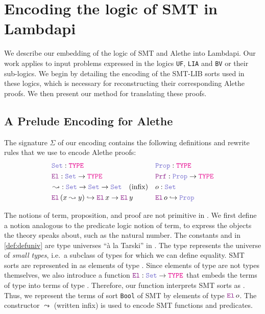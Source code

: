 
\chapter{Encoding the logic of SMT in Lambdapi} \label{ch:encoding}

We describe our embedding of the logic of SMT and Alethe into Lambdapi.
Our work applies to input problems expressed in the logics \texttt{UF}, \texttt{LIA} and \texttt{BV} or their sub-logics.
We begin by detailing the encoding of the SMT-LIB sorts used in these logics, which is necessary for reconstructing their corresponding Alethe proofs.
We then present our method for translating these proofs.

\section{A Prelude Encoding for Alethe}
\label{sec:encoding-prelude}

\begin{definition}
\label{def:defuniv}
The signature $\Sigma$ of our encoding contains the following definitions and rewrite rules that we use to encode Alethe proofs:
\begin{align*}
&\set\index{\set}: \type & &\prop\index{\prop}: \type \\
&\index{\el{}} \el{}: \set \rightarrow \type  & &\index{\prf}\prf{} : \prop \rightarrow \type \\
&\mathop{\leadsto}\index{$\leadsto$}: \set \rightarrow \set \rightarrow \set \quad \text{(infix)} & &o: \set \\
&\el\,(x \leadsto y) \hookrightarrow \el\,x \rightarrow \el\,y & &\el\,o\index{o}  \hookrightarrow \prop
\end{align*}
\end{definition}

The notions of term, proposition, and proof are not primitive in \lpm.
We ﬁrst deﬁne a notion analogous to the predicate logic notion of term, to express the objects the theory speaks about, such as the natural number.
The constants \set{} and \prop{} in \cref{def:defuniv} are type universes ``à la Tarski'' \cite[\S Universes]{intuitype} in \lpm.
The type \set{} represents the universe of \textit{small types}, i.e.\ a subclass of types for which we can define equality.
SMT sorts are represented in \lpm{} as elements of type \set{}. Since elements of type \set{} are not types themselves, 
we also introduce a function $\el: \set \rightarrow \type$ that embeds the terms of type \set{} into terms of type \type.
Therefore, our function \el{} interprets SMT sorts as \type.
Thus, we represent the terms of sort \lstinline[language=SMT,basicstyle=\ttfamily\normalsize]|Bool| of SMT by elements of type $\el{}\,o$.
The constructor $\leadsto$ (written infix) is used to encode SMT functions and predicates.

